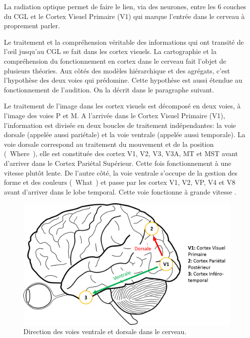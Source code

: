 	\par La radiation optique permet de faire le lien, via des neurones, entre les 6 couches du CGL et le Cortex Visuel Primaire (V1) qui marque l'entrée dans le cerveau à proprement parler.
	
	\par Le traitement et la compréhension véritable des informations qui ont transité de l'œil jusqu'au CGL se fait dans les cortex visuels. La cartographie et la compréhension du fonctionnement en cortex dans le cerveau fait l'objet de plusieurs théories. Aux côtés des modèles hiérarchique et des agrégats, c'est l'hypothèse des deux voies \citep{ingle_two_1982, mishkin_object_1983, goodale_neurological_1991} qui prédomine. Cette hypothèse est aussi étendue au fonctionnement de l'audition. On la décrit dans le paragraphe suivant.
	
	\par Le traitement de l'image dans les cortex visuels est décomposé en deux voies, à l'image des voies P et M. A l'arrivée dans le Cortex Visuel Primaire (V1), l'information est divisée en deux boucles de traitement indépendantes: la voie dorsale (appelée aussi pariétale) et la voie ventrale (appelée aussi temporale). La voie dorsale correspond au traitement du mouvement et de la position (\guillemotleft~Where~\guillemotright), elle est constituée des cortex V1, V2, V3, V3A, MT et MST avant d'arriver dans le Cortex Pariétal Supérieur. Cette fois fonctionnement à une vitesse plutôt lente. De l'autre côté, la voie ventrale s'occupe de la gestion des forme et des couleurs (\guillemotleft~What~\guillemotright) et passe par les cortex V1, V2, VP, V4 et V8 avant d'arriver dans le lobe temporal. Cette voie fonctionne à grande vitesse \citep{dhondt_emotion_2011, kaiser_dorsal_2010}.
	
	\begin{figure}
		\centering
		\includegraphics[scale=.35]{Figures/VoiesVentraleDorsale}
		\caption{Direction des voies ventrale et dorsale dans le cerveau.}
		\label{fig:voies_ventrale_dorsale}
	\end{figure}
	
